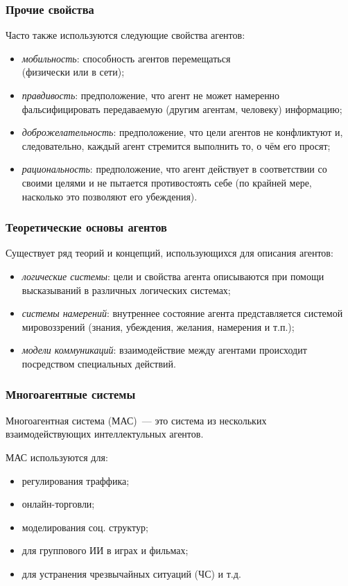 \documentclass{beamer}
\begin{document}
\begin{frame}
  \frametitle{Прочие свойства}
  Часто также используются следующие свойства агентов:

  \begin{itemize}
    \item<1-> {\it мобильность}: способность агентов перемещаться \\ (физически или в сети);
    \item<2-> {\it правдивость}: предположение, что агент не может намеренно фальсифицировать передаваемую (другим агентам, человеку) информацию;
    \item<3-> {\it доброжелательность}: предположение, что цели агентов не конфликтуют и, следовательно, каждый агент
      стремится выполнить то, о чём его просят;
    \item<4-> {\it рациональность}: предположение, что агент действует в соответствии со своими целями и не пытается
      противостоять себе (по крайней мере, насколько это позволяют его убеждения).
  \end{itemize}
\end{frame}

\begin{frame}
  \frametitle{Теоретические основы агентов}
  Существует ряд теорий и концепций, использующихся для описания агентов:

  \begin{itemize}
    \item {\it логические системы}:
      цели и свойства агента описываются при помощи высказываний
      в различных логических системах;
    \item {\it системы намерений}:
      внутреннее состояние агента представляется системой
      мировоззрений (знания, убеждения, желания, намерения и т.п.);
    \item {\it модели коммуникаций}:
      взаимодействие между агентами происходит посредством специальных
      действий.
  \end{itemize}
\end{frame}

\begin{frame}
  \frametitle{Многоагентные системы}
  Многоагентная система (МАС)~--- это система из нескольких взаимодействующих
  интеллектульных агентов.

  МАС используются для:
  \begin{itemize}
    \item регулирования траффика;
    \item онлайн-торговли;
    \item моделирования соц. структур;
    \item для группового ИИ в играх и фильмах;
    \item для устранения чрезвычайных ситуаций (ЧС) и т.д.
  \end{itemize}
\end{frame}
\end{document}
